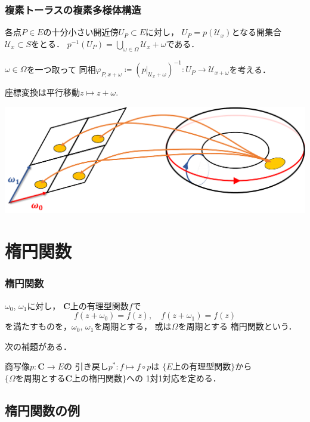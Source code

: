 \documentclass[dvipdfmx,12pt,aspectratio=169]{beamer}%
\newcommand{\cc}{\mathbf{C}}
\newcommand{\mcal}{\mathcal}
\newcommand{\dip}{\displaystyle} %
\newcommand{\pphi}{\varphi} %
\newcommand{\UU}{\mcal{U}}
\newcommand{\mapres}[2]{\left. #1 \right|_{#2}}
\begin{document}
\begin{frame}
    \frametitle{複素トーラスの複素多様体構造}
        各点$P\in E$の十分小さい開近傍$U_P\subset E$に対し，
        $U_P=p(\UU_x)$となる開集合$\UU_x\subset S$をとる．
        $\dip p^{-1}(U_P)=\underset{\omega\in\Omega}{\bigcup}\UU_x+\omega$である．

        $\omega\in\Omega$を一つ取って
        同相$\pphi_{P,x+\omega}\coloneqq
        \left(\mapres{p}{\UU_x+\omega}\right)^{-1}\colon 
        U_P\to\UU_{x+\omega}$を考える．

        座標変換は平行移動$z\mapsto z+\omega$.


        \includegraphics[width=0.7\hsize]{fig/atlas.pdf}
        \centering
\end{frame}

\section{楕円関数}

\begin{frame}
    \frametitle{楕円関数}

    \begin{Definition}
        $\omega_0$, $\omega_1$に対し，
        $\cc$上の有理型関数$f$で
        \begin{equation*}
            f(z+\omega_0)=f(z),\quad f(z+\omega_1)=f(z)
        \end{equation*}
        を満たすものを，$\omega_0$, $\omega_1$を周期とする，
        或は$\Omega$を周期とする
        楕円関数という．
    \end{Definition}

    次の補題がある．
    
    \begin{Lemma}\label{lem:corr}
        商写像$p\colon\cc\to E$の
        引き戻し$p^{\ast}\colon f\mapsto f\circ p$は
        $\{E\text{上の有理型関数}\}$から
        $\{\Omega\text{を周期とする}\cc\text{上の楕円関数}\}$への
        1対1対応を定める．
    \end{Lemma}
\end{frame}


\subsection{楕円関数の例}
\end{document}
